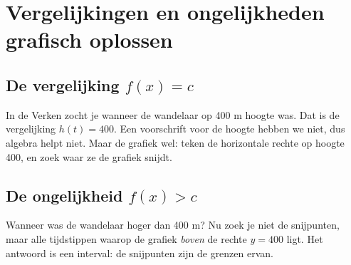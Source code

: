 \begin{oefeningen}


\end{oefeningen}

\section{Vergelijkingen en ongelijkheden grafisch oplossen}

\subsection{De vergelijking $f(x) = c$}

In de Verken zocht je wanneer de wandelaar op 400 m hoogte was. Dat is de vergelijking $h(t) = 400$. Een voorschrift voor de hoogte hebben we niet, dus algebra helpt niet. Maar de grafiek wel: teken de horizontale rechte op hoogte 400, en zoek waar ze de grafiek snijdt.


\subsection{De ongelijkheid $f(x) > c$}

Wanneer was de wandelaar hoger dan 400 m? Nu zoek je niet de snijpunten, maar alle tijdstippen waarop de grafiek \textit{boven} de rechte $y = 400$ ligt. Het antwoord is een interval: de snijpunten zijn de grenzen ervan.

